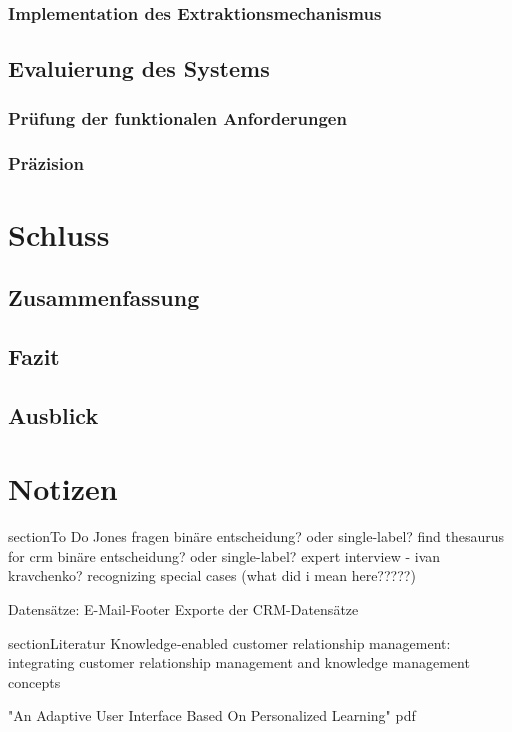 \subsection{Implementation des Extraktionsmechanismus}
\section{Evaluierung des Systems}
\subsection{Prüfung der funktionalen Anforderungen}
\subsection{Präzision}


\chapter{Schluss}
\section{Zusammenfassung}
\section{Fazit}
\section{Ausblick}

\chapter{Notizen}

section{To Do}
Jones fragen
binäre entscheidung? oder single-label?
find thesaurus for crm
binäre entscheidung? oder single-label?
expert interview - ivan kravchenko?
recognizing special cases (what did i mean here?????)

Datensätze:
E-Mail-Footer
Exporte der CRM-Datensätze

section{Literatur}
Knowledge‐enabled customer relationship management: integrating customer relationship management and knowledge management concepts

"An Adaptive User Interface Based On Personalized Learning" pdf

